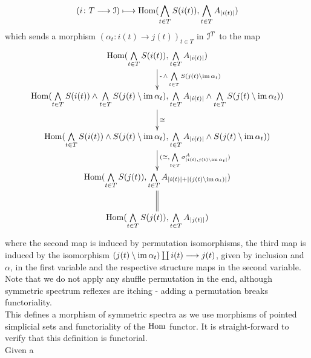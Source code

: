\begin{defn}
\begin{gather*}
        (i \colon T \to \cI) \mapsto %
          \Hom(\bigwedge_{t \in T} S(i(t)), \bigwedge_{t \in T} A_{\abs{i(t)}} )
      \end{gather*}
      which sends a morphism $(\alpha_t \colon i(t) \to j(t))_{t \in T}$ in $\mathcal{I}^T$ to the map
      \begin{displaymath}
        \xymatrix{
          \Hom(\bigwedge\limits_{t \in T} S(i(t)), \bigwedge\limits_{t \in T} A_{\abs{i(t)}})
            \ar[d]^-{ \operatorname{-} \wedge \bigwedge\limits_{t \in T} S(j(t) \setminus \im \alpha_t) } \\
          \Hom(\bigwedge\limits_{t \in T} S(i(t)) \wedge %
            \bigwedge\limits_{t \in T} S(j(t) \setminus \im \alpha_t), %
            \bigwedge\limits_{t \in T} A_{\abs{i(t)}} \wedge %
            \bigwedge\limits_{t \in T} S(j(t) \setminus \im \alpha_t))
            \ar[d]^-{\cong} \\
          \Hom(\bigwedge\limits_{t \in T} S(i(t)) \wedge S(j(t) \setminus \im \alpha_t), %
            \bigwedge\limits_{t \in T} A_{\abs{i(t)}} \wedge S(j(t) \setminus \im \alpha_t)) 
            \ar[d]^-{(\cong, \bigwedge\limits_{t \in T} \sigma^A_{\abs{i(t),j(t)\setminus\im\alpha_t}})} \\
          \Hom(\bigwedge\limits_{t \in T} S(j(t)), \bigwedge\limits_{t \in T} A_{\abs{i(t)} + \abs{(j(t)\setminus \im \alpha_t)}})
            \ar@{=}[d] \\
          \Hom(\bigwedge\limits_{t \in T} S(j(t)), \bigwedge\limits_{t \in T} A_{\abs{j(t)}})
        }
      \end{displaymath}
      where the second map is induced by permutation isomorphisms, the third map
      is induced by the isomorphism $(j(t) \setminus \operatorname{im} \alpha_t) \coprod i(t)
      \longrightarrow j(t)$, given by inclusion and $\alpha$, in the first variable and the
      respective structure maps in the second variable. Note that we do not
      apply any shuffle permutation in the end, although symmetric spectrum
      reflexes are itching - adding a permutation breaks functoriality.\\ This
      defines a morphism of symmetric spectra as we use morphisms of pointed
      simplicial sets and functoriality of the $\operatorname{Hom}$ functor. It is
      straight-forward to verify that this definition is functorial.\\ Given a

\end{defn}
